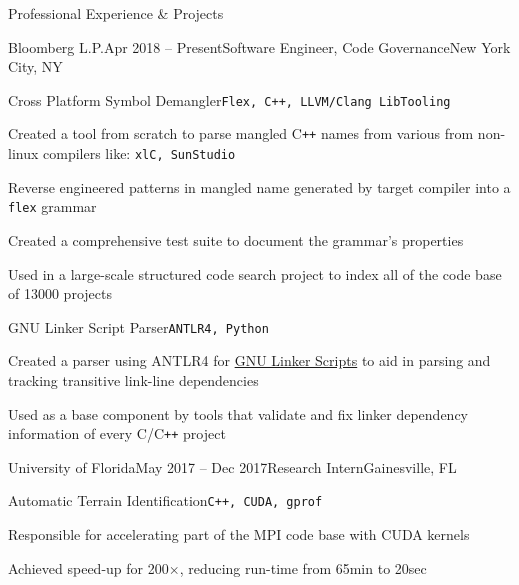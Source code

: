 \begin{rSection}{Professional Experience \& Projects}
\begin{workEx}{Bloomberg L.P.}{Apr 2018 -- Present}{Software Engineer, Code Governance}{New York City, NY}
%
%
\begin{project}{Cross Platform Symbol Demangler}{\texttt{Flex, C++, LLVM/Clang LibTooling}}
\item Created a tool from scratch to parse mangled C\texttt{++} names from various from non-linux compilers like: \texttt{xlC, SunStudio}
\item Reverse engineered patterns in mangled name generated by target compiler into a \texttt{flex} grammar
\item Created a comprehensive test suite to document the grammar's properties
\item Used in a large-scale structured code search project to index all of the code base of 13000 projects
\end{project}

%
%
\begin{project}{GNU Linker Script Parser}{\texttt{ANTLR4, Python}}
\item Created a parser using ANTLR4 for \href{https://sourceware.org/binutils/docs/ld/Scripts.html}{GNU Linker Scripts} to aid in parsing and tracking transitive link-line dependencies
\item Used as a base component by tools that validate and fix linker dependency information of every C/C\texttt{++} project
\end{project}

\end{workEx}

\begin{workEx}{University of Florida}{May 2017 -- Dec 2017}{Research Intern}{Gainesville, FL}
\begin{project}{Automatic Terrain Identification}{\texttt{C++, CUDA, gprof}}
\item Responsible for accelerating part of the MPI code base with CUDA kernels
\item Achieved speed-up for 200$\times$, reducing run-time from 65min to 20sec
\end{project}
\end{workEx}

\end{rSection}